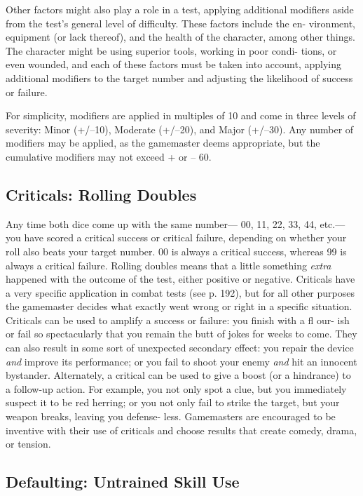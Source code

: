 Other factors might also play a 
role in a test, applying additional 
modifiers aside from the test's 
general level of difficulty. These factors include the en-
vironment, equipment (or lack thereof), and the health 
of the character, among other things. The character 
might be using superior tools, working in poor condi-
tions, or even wounded, and each of these factors must 
be taken into account, applying additional modifiers 
to the target number and adjusting the likelihood of 
success or failure.

For simplicity, modifiers are applied in multiples of 
10 and come in three levels of severity: Minor (+/–10), 
Moderate (+/–20), and Major (+/–30). Any number of 
modifiers may be applied, as the gamemaster deems 
appropriate, but the cumulative modifiers may not 
exceed + or – 60.

\subsection{Criticals: Rolling Doubles}

Any time both dice come up with the same number—
00, 11, 22, 33, 44, etc.—you have scored a critical 
success or critical failure, depending on whether your 
roll also beats your target number. 00 is always a 
critical success, whereas 99 is always a critical failure. 
Rolling doubles means that a little something \textit{extra }
happened with the outcome of the test, either positive 
or negative. Criticals have a very specific application 
in combat tests (see p. 192), but for all other purposes 
the gamemaster decides what exactly went wrong or 
right in a specific situation. Criticals can be used to 
amplify a success or failure: you finish with a fl our-
ish or fail so spectacularly that you remain the butt 
of jokes for weeks to come. They can also result in 
some sort of unexpected secondary effect: you repair 
the device \textit{and} improve its performance; or you fail 
to shoot your enemy \textit{and} hit an innocent bystander. 
Alternately, a critical can be used to give a boost (or 
a hindrance) to a follow-up action. For example, you 
not only spot a clue, but you immediately suspect it 
to be red herring; or you not only fail to strike the 
target, but your weapon breaks, leaving you defense-
less. Gamemasters are encouraged to be inventive with 
their use of criticals and choose results that create 
comedy, drama, or tension.

\subsection{Defaulting: Untrained Skill Use}

